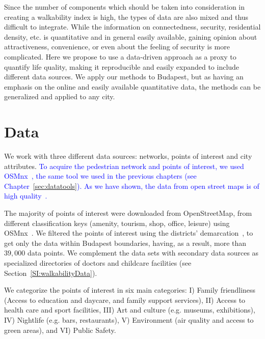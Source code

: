 Since the number of components which should be taken into consideration in creating a walkability index is high, the types of data are also mixed and thus difficult to integrate. While the information on connectedness, security, residential density, etc. is quantitative and in general easily available, gaining opinion about attractiveness, convenience, or even about the feeling of security is more complicated. Here we propose to use a data-driven approach as a proxy to quantify life quality, making it reproducible and easily expanded to include different data sources. We apply our methods to Budapest, but as having an emphasis on the online and easily available quantitative data, the methods can be generalized and applied to any city.

\section{Data}
We work with three different data sources: networks, points of interest and city attributes. \textcolor{blue}{To acquire the pedestrian network and points of interest, we used OSMnx~\cite{boeing2017osmnx}, the same tool we used in the previous chapters (see Chapter~\ref{sec:datatools}). As we have shown, the data from open street maps is of high quality~\cite{haklay2010openstreetmap,girres2010quality,Ferster2019Bicycle,barbosa2018human}.}%

The majority of points of interest were downloaded from OpenStreetMap, from different classification keys (amenity, tourism, shop, office, leisure) using OSMnx~\cite{boeing2017osmnx}. We filtered the points of interest using the districts' demarcation~\cite{HU2019Districts}, to get only the data within Budapest boundaries, having, as a result, more than $39,000$ data points. We complement the data sets with secondary data sources as specialized directories of doctors and childcare facilities (see Section~\ref{SI:walkabilityData}).

We categorize the points of interest in six main categories: I) Family friendliness (Access to education and daycare, and family support services), II) Access to health care and sport facilities, III) Art and culture (e.g. museums, exhibitions), IV) Nightlife (e.g. bars, restaurants), V) Environment (air quality and access to green areas), and VI) Public Safety. %

